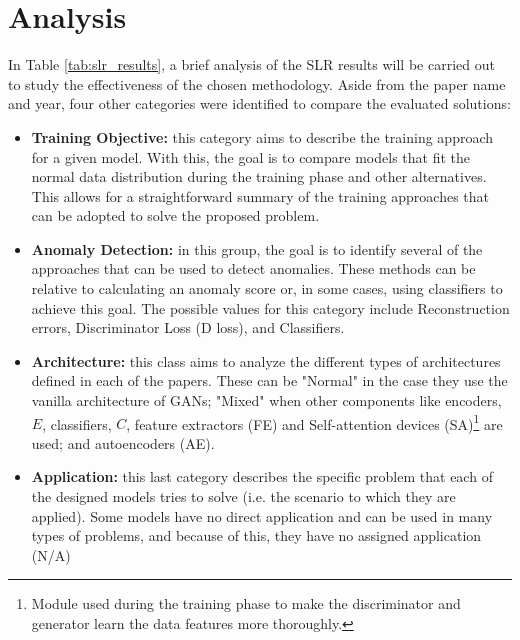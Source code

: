 \section{Analysis}\label{sec:gan_res_analysis}
In Table \ref{tab:slr_results}, a brief analysis of the SLR results will be carried out to study the effectiveness of the chosen methodology. Aside from the paper name and year, four other categories were identified to compare the evaluated solutions:

\begin{itemize}
    \item \textbf{Training Objective:} this category aims to describe the training approach for a given model. With this, the goal is to compare models that fit the normal data distribution during the training phase and other alternatives. This allows for a straightforward summary of the training approaches that can be adopted to solve the proposed problem.

    \item \textbf{Anomaly Detection:} in this group, the goal is to identify several of the approaches that can be used to detect anomalies. These methods can be relative to calculating an anomaly score or, in some cases, using classifiers to achieve this goal. The possible values for this category include Reconstruction errors, Discriminator Loss (D loss), and Classifiers.

    \item \textbf{Architecture:} this class aims to analyze the different types of architectures defined in each of the papers. These can be "Normal" in the case they use the vanilla architecture of GANs;  "Mixed" when other components like encoders, $E$, classifiers, $C$, feature extractors (FE) and Self-attention devices (SA)\footnote{Module used during the training phase to make the discriminator and generator learn the data features more thoroughly.} are used; and autoencoders (AE).

    \item \textbf{Application:} this last category describes the specific problem that each of the designed models tries to solve (i.e. the scenario to which they are applied). Some models have no direct application and can be used in many types of problems, and because of this, they have no assigned application (N/A)
\end{itemize}



